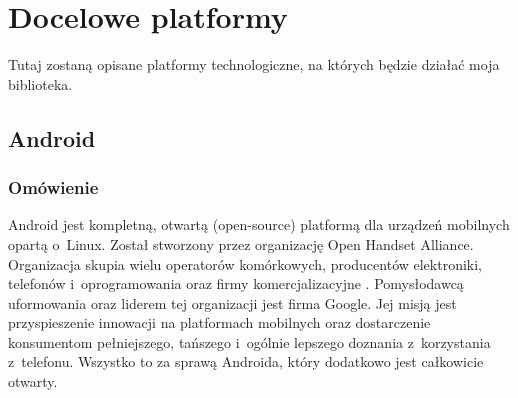 %

\section{Docelowe platformy}
Tutaj zostaną opisane platformy technologiczne, na których będzie działać moja biblioteka.

\subsection{Android}
\label{android}

\subsubsection{Omówienie}
Android jest kompletną, otwartą (open-source) platformą dla urządzeń mobilnych opartą o~Linux\cite{learning-android}. Został stworzony przez organizację Open Handset Alliance. Organizacja skupia wielu operatorów komórkowych, producentów elektroniki, telefonów i~oprogramowania oraz firmy komercjalizacyjne \cite{oha}. Pomysłodawcą uformowania oraz liderem tej organizacji jest firma Google. Jej misją jest przyspieszenie innowacji na platformach mobilnych oraz dostarczenie konsumentom pełniejszego, tańszego i~ogólnie lepszego doznania z~korzystania z~telefonu. Wszystko to za sprawą Androida, który dodatkowo jest całkowicie otwarty.

